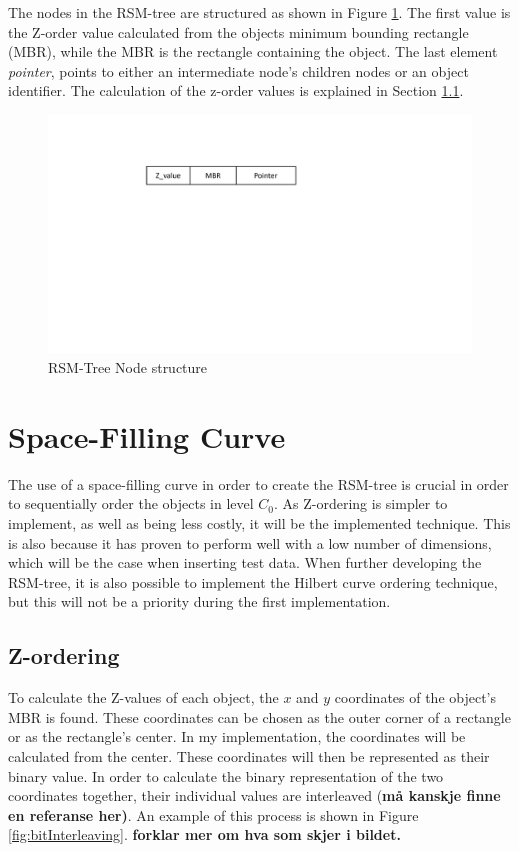 The nodes in the RSM-tree are structured as shown in Figure \ref{fig:nodeRSM}. The first value is the Z-order value calculated from the objects minimum bounding rectangle (MBR), while the MBR is the rectangle containing the object. The last element \emph{pointer}, points to either an intermediate node's children nodes or an object identifier. The calculation of the z-order values is explained in Section \ref{sect:zordering}. 

\begin{figure}[ht]
    \centering
    \includegraphics[scale=0.5]{figures/node_RSM.pdf}
    \caption{RSM-Tree Node structure}
    \label{fig:nodeRSM}
\end{figure}

\section{Space-Filling Curve}
\label{sect:ordering}
The use of a space-filling curve in order to create the RSM-tree is crucial in order to sequentially order the objects in level $C_0$. As Z-ordering is simpler to implement, as well as being less costly, it will be the implemented technique. This is also because it has proven to perform well with a low number of dimensions\cite{IrregularSpace}, which will be the case when inserting test data. When further developing the RSM-tree, it is also possible to implement the Hilbert curve ordering technique, but this will not be a priority during the first implementation. 

\subsection{Z-ordering}
\label{sect:zordering}
To calculate the Z-values of each object, the $x$ and $y$ coordinates of the object's MBR is found. These coordinates can be chosen as the outer corner of a rectangle or as the rectangle's center. In my implementation, the coordinates will be calculated from the center. These coordinates will then be represented as their binary value. In order to calculate the binary representation of the two coordinates together, their individual values are interleaved (\textbf{må kanskje finne en referanse her)}. An example of this process is shown in Figure \ref{fig:bitInterleaving}. \textbf{forklar mer om hva som skjer i bildet.}


